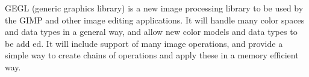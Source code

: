 GEGL (generic graphics library) is a new image processing library to be used by the GIMP and other image editing applications. It will handle many color spaces and data types in a general way, and allow new color models and data types to be add ed.  It will include support of many image operations, and provide a simple way to create chains of operations and apply these in a memory efficient way.

